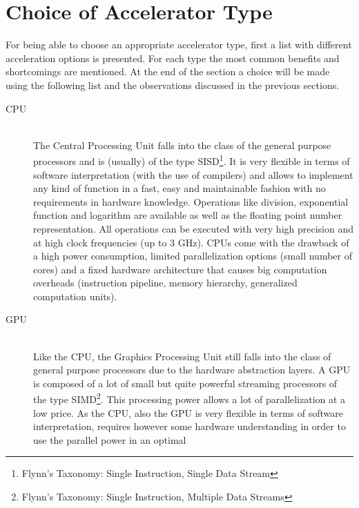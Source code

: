 \documentclass[mscthesis]{usiinfthesis}
\begin{document}
\section{Choice of Accelerator Type}
\label{ch:analysis_choice}

For being able to choose an appropriate accelerator type, first a list with
different acceleration options is presented. For each type the most common
benefits and shortcomings are mentioned. At the end of the section a choice
will be made using the following list and the observations discussed in the
previous sections.

\begin{description}
    \item[CPU] \hfill \\
        The Central Processing Unit falls into the class of the general purpose
        processors and is (usually) of the type SISD\footnote{Flynn's Taxonomy:
        Single Instruction, Single Data Stream}. It is very flexible in terms
        of software interpretation (with the use of compilers) and allows to
        implement any kind of function in a fast, easy and maintainable
        fashion with no requirements in hardware knowledge.  Operations like
        division, exponential function and logarithm are available as well as
        the floating point number representation. All operations can be
        executed with very high precision and at high clock frequencies (up to
        3 GHz). CPUs come with the drawback of a high power consumption,
        limited parallelization options (small number of cores) and a fixed
        hardware architecture that causes big computation overheads
        (instruction pipeline, memory hierarchy, generalized computation
        units).
    \item[GPU] \hfill \\
        Like the CPU, the Graphics Processing Unit still falls into the class
        of general purpose processors due to the hardware abstraction layers.
        A GPU is composed of a lot of small but quite powerful streaming
        processors of the type SIMD\footnote{Flynn's Taxonomy: Single
        Instruction, Multiple Data Streams}. This processing power allows a lot
        of parallelization at a low price. As the CPU, also the GPU is very
        flexible in terms of software interpretation, requires however some
        hardware understanding in order to use the parallel power in an optimal

\end{description}
\end{document}
